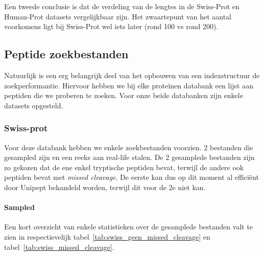 \documentclass[11pt,dutch,faculty=we,layout=titlefont,underline=false,titleUppercase=true,titleUnderline=true]{ugent2016-report}
\begin{document}
    Een tweede conclusie is dat de verdeling van de lengtes in de Swiss-Prot en Human-Prot datasets vergelijkbaar zijn.
    Het zwaartepunt van het aantal voorkomens ligt bij Swiss-Prot wel iets later (rond 100 vs rond 200).

    \subsection{Peptide zoekbestanden}\label{subsec:peptide-zoek-bestanden}
    Natuurlijk is een erg belangrijk deel van het opbouwen van een indexstructuur de zoekperformantie.
    Hiervoor hebben we bij elke proteïnen databank een lijst aan peptiden die we proberen te zoeken.
    Voor onze beide databanken zijn enkele datasets opgesteld.

    \subsubsection{Swiss-prot} Voor deze databank hebben we enkele zoekbestanden voorzien.
    2 bestanden die gesampled zijn en een reeks aan real-life stalen.
    De 2 gesamplede bestanden zijn zo gekozen dat de ene enkel tryptische peptiden bevat, terwijl de andere ook peptiden bevat met \textit{missed cleavage}.
    De eerste kan dus op dit moment al efficiënt door Unipept behandeld worden, terwijl dit voor de 2e niet kan.

    \paragraph{Sampled}
    Een kort overzicht van enkele statistieken over de gesamplede bestanden valt te zien in respectievelijk tabel~\ref{tab:swiss_geen_missed_cleavage} en tabel~\ref{tab:swiss_missed_cleavage}.
\end{document}

